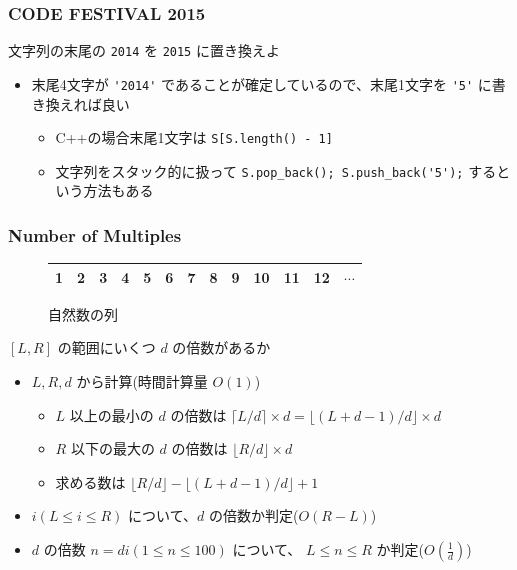 \documentclass[t, aspectratio=169, dvipdfmx]{beamer}
\begin{document}
\begin{frame}[containsverbatim]
  \frametitle{CODE FESTIVAL 2015}
  文字列の末尾の \verb|2014| を \verb|2015| に置き換えよ
  \begin{itemize}
    \item 末尾4文字が \verb|'2014'| であることが確定しているので、末尾1文字を \verb|'5'| に書き換えれば良い
    \begin{itemize}
      \item C++の場合末尾1文字は \verb|S[S.length() - 1]|
      \item 文字列をスタック的に扱って \verb|S.pop_back(); S.push_back('5');| するという方法もある
    \end{itemize}
  \end{itemize}
\end{frame}

\begin{frame}
  \frametitle{Number of Multiples}
  \begin{figure}[b]
    \begin{tabular}{*{13}{|c}|}  & 2 & 3 & 4 & 5 & 6 & 7 & 8 & 9 & 10 & 11 & 12 & $\cdots$ \\ \hline
    \end{tabular}
    \caption{自然数の列}
  \end{figure}
  $[L,R]$ の範囲にいくつ $d$ の倍数があるか
  \begin{itemize}
    \item $L,R,d$ から計算(時間計算量 $O(1)$)
    \begin{itemize}
      \item $L$ 以上の最小の $d$ の倍数は $\lceil L/d \rceil \times d=\lfloor (L+d-1)/d \rfloor \times d$
      \item $R$ 以下の最大の $d$ の倍数は $\lfloor R/d \rfloor \times d$
      \item 求める数は $\lfloor R/d \rfloor - \lfloor (L+d-1)/d \rfloor + 1$
    \end{itemize}
    \item $i(L \leq i \leq R)$ について、$d$ の倍数か判定($O(R-L)$)
    \item $d$ の倍数 $n=di(1 \leq n \leq 100)$ について、 $L \leq n \leq R$ か判定($O(\frac{1}{d})$)
  \end{itemize}
\end{frame}

\begin{frame}[c]
\end{frame}
\end{document}
